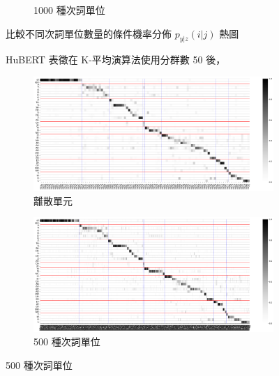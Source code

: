 {{{\begin{figure}
\begin{subfigure}{\textwidth}
                 \caption{1000 種次詞單位}
                 \label{fig:hub-u050-ap1000-givenunit-byphn}
             \end{subfigure}

             \caption{HuBERT 表徵在 K-平均演算法使用分群數 50 後，}
             比較不同次詞單位數量的條件機率分佈 $p_{y|z}(i | j)$ 熱圖
             \label{fig:hub-u050-comparisons}
        \end{figure}
    }
    {
        \newcommand{\tempwidth}[0]{0.8\linewidth}
        \begin{figure}
             \centering
             \begin{subfigure}{\textwidth}
                 \centering
                 \includegraphics[width=\tempwidth]{figures/ch4figs/hub-u100-ap0000-givenunit-byphn.png}
                 \caption{離散單元}
                 \label{fig:hub-u100-ap0000-givenunit-byphn}
             \end{subfigure}
             \vfill
             \begin{subfigure}{\textwidth}
                 \centering
                 \includegraphics[width=\tempwidth]{figures/ch4figs/hub-u100-ap0500-givenunit-byphn.png}
                 \caption{500 種次詞單位}
                 \label{fig:hub-u100-ap0500-givenunit-byphn}
             \end{subfigure}

\end{figure}}}}
